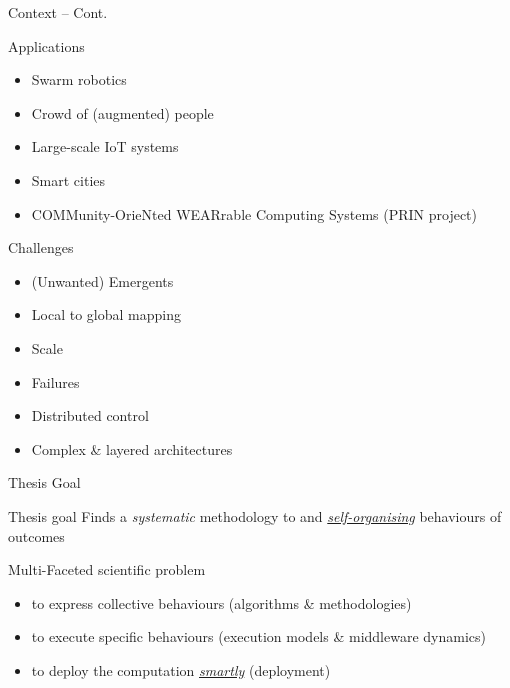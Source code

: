 \documentclass[presentation, 9pt]{beamer}\mode<presentation>{\usetheme{AMSBolognaFC}}
\begin{document}
\begin{frame}{Context -- Cont.}
\begin{alertblock}{Applications}
  \begin{multicols}{3}
    \begin{itemize}
      \item Swarm robotics
      \item Crowd of (augmented) people
      \item Large-scale IoT systems
      \item Smart cities
      \item COMMunity-OrieNted WEARrable Computing Systems (PRIN project)
    \end{itemize}
  \end{multicols}
\end{alertblock}

\begin{exampleblock}{Challenges}
  \begin{multicols}{3}
    \begin{itemize}
      \item (Unwanted) Emergents
      \item Local to global mapping
      \item Scale
      \item Failures
      \item Distributed control
      \item Complex \& layered architectures
    \end{itemize}
  \end{multicols}
\end{exampleblock}
\centering
\vspace{0.5 cm}
\end{frame}
\begin{frame}{Thesis Goal}
  \begin{alertblock}{Thesis goal}
    Finds a \emph{systematic} methodology to  and  \emph{\underline{self-organising}} behaviours of  outcomes
  \end{alertblock}
  \begin{exampleblock}{Multi-Faceted scientific problem}
    \begin{itemize}
      \item {} to express collective behaviours (algorithms \& methodologies)
      \item {} to execute specific behaviours (execution models \& middleware dynamics)
      \item {} to deploy the computation \emph{\underline{smartly}} (deployment)      
    \end{itemize}
  \end{exampleblock}
\end{frame}
\end{document}

